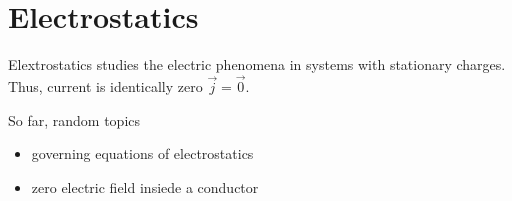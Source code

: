 \documentclass[letterpaper,10pt,english]{jupyterBook}
\begin{document}
\section{Electrostatics}
\label{\detokenize{ch/regimes-electrostatics:electrostatics}}\label{\detokenize{ch/regimes-electrostatics:classical-electromagnetism-electrostatics}}\label{\detokenize{ch/regimes-electrostatics::doc}}
\sphinxAtStartPar
Elextrostatics studies the electric phenomena in systems with stationary charges. Thus, current is identically zero \(\vec{j} = \vec{0}\).

\sphinxAtStartPar
So far, random topics
\begin{itemize}
\item {} 
\sphinxAtStartPar
governing equations of electrostatics

\item {} 
\sphinxAtStartPar
zero electric field insiede a conductor

\end{itemize}
\end{document}
